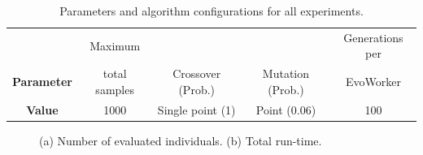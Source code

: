 \begin{table}[t]
\caption{Parameters and algorithm configurations for all experiments.}
\centering
\begin{tabular}{|c||c|c|c|c|}
   \hline
                       & Maximum          &                    &                  & Generations per \\
   \textbf{Parameter}  & total samples    & Crossover (Prob.)  & Mutation (Prob.) & EvoWorker        \\

	\hline
   \textbf{Value}     &	1000 &	Single point (1) &	Point  (0.06)   & 100    \\
   \hline

\end{tabular}
\label{tab:exp2}
\end{table}


%
%

\begin{figure}[t]
    \centering
    \caption{
    (a) Number of evaluated individuals.
    (b) Total run-time.}
    \label{fig:effort}
\end{figure}

